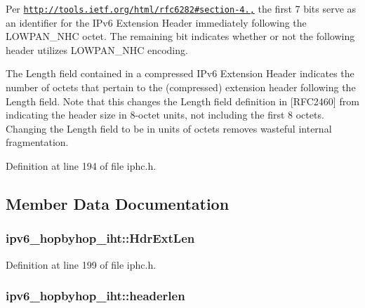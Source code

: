 Per \href{http://tools.ietf.org/html/rfc6282#section-4.2,}{\tt http\+://tools.\+ietf.\+org/html/rfc6282\#section-\/4.,} the first 7 bits serve as an identifier for the I\+Pv6 Extension Header immediately following the L\+O\+W\+P\+A\+N\+\_\+\+N\+HC octet. The remaining bit indicates whether or not the following header utilizes L\+O\+W\+P\+A\+N\+\_\+\+N\+HC encoding.

The Length field contained in a compressed I\+Pv6 Extension Header indicates the number of octets that pertain to the (compressed) extension header following the Length field. Note that this changes the Length field definition in \mbox{[}R\+F\+C2460\mbox{]} from indicating the header size in 8-\/octet units, not including the first 8 octets. Changing the Length field to be in units of octets removes wasteful internal fragmentation. 

Definition at line 194 of file iphc.\+h.



\subsection{Member Data Documentation}
\subsubsection[{\texorpdfstring{Hdr\+Ext\+Len}{HdrExtLen}}]{ ipv6\+\_\+hopbyhop\+\_\+iht\+::\+Hdr\+Ext\+Len}\hypertarget{structipv6__hopbyhop__iht_af74b3cb3f3fbaaa924299aefa0def813}{}\label{structipv6__hopbyhop__iht_af74b3cb3f3fbaaa924299aefa0def813}


Definition at line 199 of file iphc.\+h.

\subsubsection[{\texorpdfstring{headerlen}{headerlen}}]{ ipv6\+\_\+hopbyhop\+\_\+iht\+::headerlen}\hypertarget{structipv6__hopbyhop__iht_a84ded5a6acf93585a72afb6c076378d3}{}\label{structipv6__hopbyhop__iht_a84ded5a6acf93585a72afb6c076378d3}


